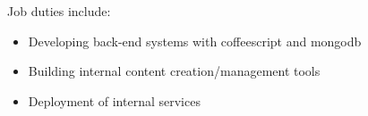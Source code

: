 \normalsize
Job duties include:
\small
\begin{itemize}
    \item Developing back-end systems with coffeescript and mongodb
    \item Building internal content creation/management tools
    \item Deployment of internal services
\end{itemize}
\normalsize
\medskip
